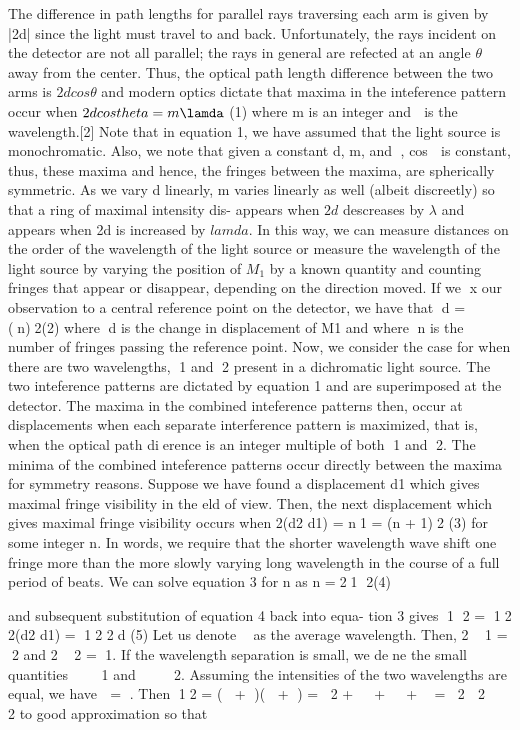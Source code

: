 \documentclass[12pt,twocolumn]{article}
\begin{document}
The difference in path lengths for parallel rays traversing each arm is given by |2d| since the light must travel to and back. Unfortunately, the rays incident on the detector are not all parallel; the rays in general are refected at an angle $\theta$ away from the center. Thus, the optical
path length difference between the two arms is $2d cos \theta$ and modern optics dictate that maxima in the inteference pattern occur when
$2d cos theta = m\lamda$ (1)
where m is an integer and  is the wavelength.[2] Note that in equation 1, we have assumed that the light source is monochromatic. Also, we note that given a constant d, m, and , cos  is constant, thus, these maxima and
hence, the fringes between the maxima, are spherically symmetric. As we vary d linearly, m varies linearly as well (albeit discreetly) so that a ring of maximal intensity dis- appears when $2d$ descreases by $\lambda$ and appears when 2d is increased by $lamda$. In this way, we can measure distances on the order of the wavelength of the light source or measure the wavelength of the light source by varying the position of $M_1$ by a known quantity and counting fringes that appear or disappear, depending on the direction moved. If we x our observation to a central reference point on the detector, we have that
d =(n)2(2)
where d is the change in displacement of M1 and where n is the number of fringes passing the reference point. Now, we consider the case for when there are two wavelengths, 1 and 2 present in a dichromatic light source. The two inteference patterns are dictated by equation 1 and are superimposed at the detector. The maxima in the combined inteference patterns then, occur at displacements when each separate  interference pattern is maximized, that is, when the optical path dierence is an integer multiple of both 1 and 2. The minima of the combined inteference patterns occur directly between the maxima for symmetry reasons. Suppose we have found a displacement d1 which gives maximal fringe visibility in the  eld of view. Then, the next displacement which gives maximal fringe visibility occurs when
 2(d2 d1) = n1 = (n + 1)2 (3)
 for some integer n. In words, we require that the shorter wavelength wave shift one fringe more than the more slowly varying long wavelength in the course of a full period of beats. We can solve equation 3 for n as
n =21  2(4)

and subsequent substitution of equation 4 back into equa-
tion 3 gives
1  2 =
12
2(d2  d1)
=
12
2d
(5)
Let us denote 
as the average wavelength. Then, 2 
1 = 2 and 2  2 = 1. If the wavelength separation
is small, we dene the small quantities   1 and  
  2. Assuming the intensities of the two wavelengths
are equal, we have  = . Then
12 = ( + )( + )
= 2
+  +  + 
= 2
 
2
 
2
to good approximation so that
\end{document}
